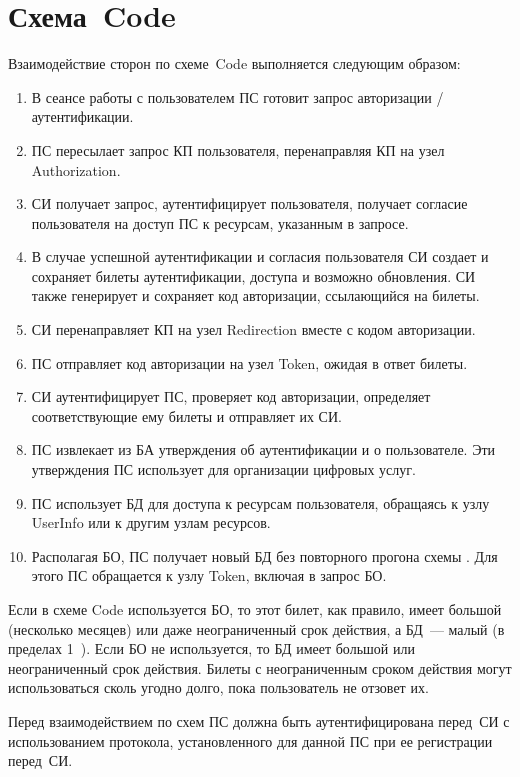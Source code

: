 \section{Схема~Code}\label{OIDC.Code}

Взаимодействие сторон по схеме~Code выполняется следующим образом:

\begin{enumerate}
\item 
В сеансе работы с пользователем ПС готовит запрос авторизации / аутентификации.

\item 
ПС пересылает запрос КП пользователя, перенаправляя КП на узел Authorization.

\item 
СИ получает запрос, аутентифицирует пользователя, получает согласие пользователя
на доступ ПС к ресурсам, указанным в запросе.

\item 
В случае успешной аутентификации и согласия пользователя СИ создает и сохраняет
билеты аутентификации, доступа и возможно обновления. СИ также генерирует и
сохраняет код авторизации, ссылающийся на билеты.

\item 
СИ перенаправляет КП на узел Redirection вместе с кодом авторизации.
 
\item 
ПС отправляет код авторизации на узел Token, ожидая в ответ билеты. 

\item 
СИ аутентифицирует ПС, проверяет код авторизации, определяет соответствующие ему
билеты и отправляет их СИ.

\item 
ПС извлекает из БА утверждения об аутентификации и о пользователе. Эти
утверждения ПС использует для организации цифровых услуг.

\item 
ПС использует БД для доступа к ресурсам пользователя,
обращаясь к узлу UserInfo или к другим узлам ресурсов. 

\item 
Располагая БО, ПС получает новый БД без повторного прогона схемы 
. Для этого ПС обращается к узлу Token, включая в запрос БО.
\end{enumerate}

Если в схеме Code используется БО, то этот билет, как правило, 
имеет большой (несколько месяцев) или даже неограниченный срок действия,
а БД~--- малый (в пределах 1~). 
%
Если БО не используется, то БД имеет большой или неограниченный срок 
действия. 
%
Билеты с неограниченным сроком действия могут использоваться сколь 
угодно долго, пока пользователь не отзовет их.

Перед взаимодействием по схем ПС должна быть аутентифицирована перед~СИ с 
использованием протокола, установленного для данной ПС при ее регистрации 
перед~СИ.
